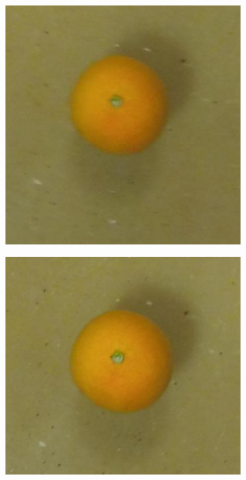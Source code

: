 \documentclass {udthesis}
\begin{document}
\begin{figure}
\begin{subfigure}[]{0.12\textwidth}
      \caption{}
  \end{subfigure}
  \begin{subfigure}[]{0.12\textwidth}
      \includegraphics[width=\textwidth]{orange4_obj_11/orange4_011_24}
      \caption{}
  \end{subfigure}
  \begin{subfigure}[]{0.12\textwidth}
      \includegraphics[width=\textwidth]{orange4_obj_11/orange4_011_22}

\end{subfigure}
\end{figure}
\end{document}
